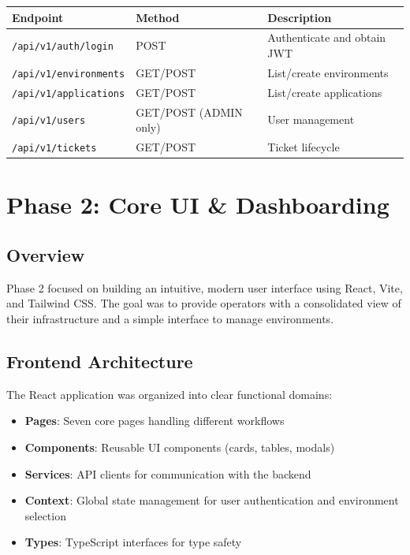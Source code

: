 \documentclass[12pt,a4paper]{report}
\begin{document}
\begin{center}
\begin{tabular}{|l|l|l|}
  \hline
  \textbf{Endpoint} & \textbf{Method} & \textbf{Description} \\
  \hline
  \texttt{/api/v1/auth/login} & POST & Authenticate and obtain JWT \\
  \hline
  \texttt{/api/v1/environments} & GET/POST & List/create environments \\
  \hline
  \texttt{/api/v1/applications} & GET/POST & List/create applications \\
  \hline
  \texttt{/api/v1/users} & GET/POST (ADMIN only) & User management \\
  \hline
  \texttt{/api/v1/tickets} & GET/POST & Ticket lifecycle \\
  \hline
\end{tabular}
\end{center}

\section{Phase 2: Core UI \& Dashboarding}

\subsection{Overview}

Phase 2 focused on building an intuitive, modern user interface using React, Vite, and Tailwind CSS. The goal was to provide operators with a consolidated view of their infrastructure and a simple interface to manage environments.

\subsection{Frontend Architecture}

The React application was organized into clear functional domains:

\begin{itemize}
  \item \textbf{Pages}: Seven core pages handling different workflows
  \item \textbf{Components}: Reusable UI components (cards, tables, modals)
  \item \textbf{Services}: API clients for communication with the backend
  \item \textbf{Context}: Global state management for user authentication and environment selection
  \item \textbf{Types}: TypeScript interfaces for type safety
\end{itemize}
\end{document}
